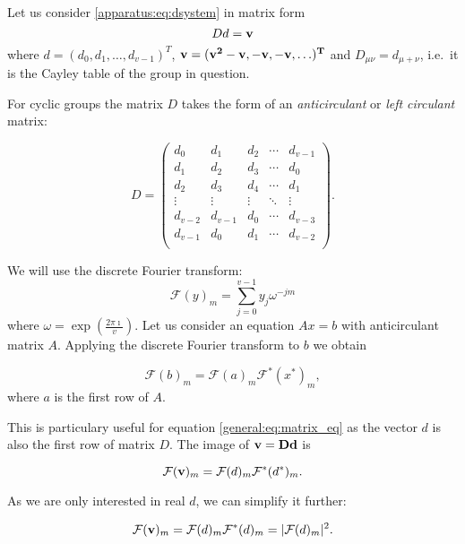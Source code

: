 Let us consider \eqref{apparatus:eq:dsystem} in matrix form 
\begin{equation}
\label{general:eq:matrix_eq}
	D d = \bf v
\end{equation}
where $d = (d_0, d_1, \ldots, d_{v-1})^T$, $\bf{v} = (v^2-v, -v, -v, \ldots)^T$ and $D_{\mu\nu} = d_{\mu+\nu}$, i.e.\ it is the Cayley table of the group in question.

For cyclic groups the matrix $D$ takes the form of an \emph{anticirculant} or \emph{left circulant} matrix:

\begin{equation}
	\label{general:eq:anticirculant_matrix}
	D =
	\begin{pmatrix}
		d_0 & d_1 & d_2 & \cdots & d_{v-1} \\ 
		d_1 & d_2 & d_3 & \cdots & d_0 \\
		d_2 & d_3 & d_4 & \cdots & d_1 \\
		\vdots & \vdots & \vdots & \ddots & \vdots \\
		d_{v-2} & d_{v-1} & d_0 & \cdots & d_{v-3} \\
		d_{v-1} & d_0 & d_1 & \cdots & d_{v-2} \\
	\end{pmatrix}.
\end{equation}

We will use the discrete Fourier transform:
\begin{equation}
	\mathcal F (y)_m = \sum_{j=0}^{v-1} y_j \omega^{-jm}
\end{equation}
where $\omega = \exp(\frac{2\pi \imath}v)$. Let us consider an equation $Ax=b$ with anticirculant matrix $A$. Applying the discrete Fourier transform to $b$ we obtain

\begin{equation}
	\label{general:eq:fourier_image}
	\mathcal F (b)_m = \mathcal F (a)_m \mathcal F ^*(x^*)_m,
\end{equation}
where $a$ is the first row of $A$.

This is particulary useful for equation \eqref{general:eq:matrix_eq} as the vector $d$ is also the first row of matrix $D$. The image of $\bf v=Dd$ is

\begin{equation}
	\mathcal{F} ({\bf v})_m = \mathcal{F}(d)_m \mathcal{F^*}(d^*)_m.
\end{equation}

As we are only interested in real $d$, we can simplify it further:

\begin{equation}
	\label{general:eq:dfourier}
	\mathcal{F} ({\bf v})_m = \mathcal{F}(d)_m \mathcal{F^*}(d)_m = |\mathcal{F}(d)_m|^2.
\end{equation}

